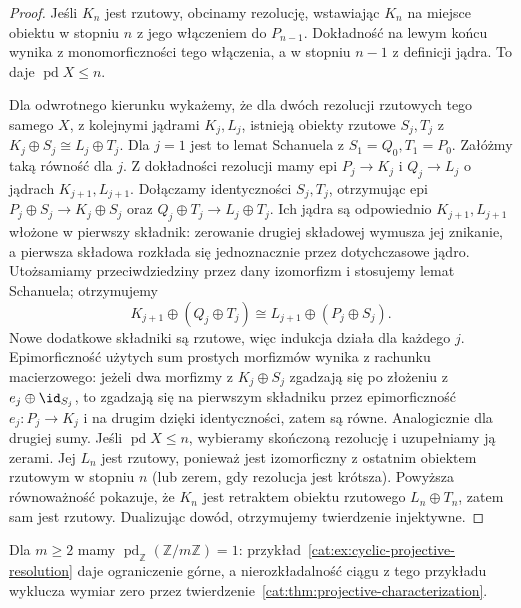 \begin{proof}
Jeśli $K_n$ jest rzutowy, obcinamy rezolucję, wstawiając $K_n$ na miejsce obiektu w stopniu $n$ z jego włączeniem do $P_{n-1}$. Dokładność na lewym końcu wynika z monomorficzności tego włączenia, a w stopniu $n-1$ z definicji jądra. To daje $\operatorname{pd}X\le n$.

Dla odwrotnego kierunku wykażemy, że dla dwóch rezolucji rzutowych tego samego $X$, z kolejnymi jądrami $K_j,L_j$, istnieją obiekty rzutowe $S_j,T_j$ z
$K_j\oplus S_j\cong L_j\oplus T_j$.
Dla $j=1$ jest to lemat Schanuela z $S_1=Q_0,T_1=P_0$. Załóżmy taką równość dla $j$. Z dokładności rezolucji mamy epi $P_j\to K_j$ i $Q_j\to L_j$ o jądrach $K_{j+1},L_{j+1}$. Dołączamy identyczności $S_j,T_j$, otrzymując epi
$P_j\oplus S_j\to K_j\oplus S_j$ oraz
$Q_j\oplus T_j\to L_j\oplus T_j$.
Ich jądra są odpowiednio $K_{j+1},L_{j+1}$ włożone w pierwszy składnik: zerowanie drugiej składowej wymusza jej znikanie, a pierwsza składowa rozkłada się jednoznacznie przez dotychczasowe jądro. Utożsamiamy przeciwdziedziny przez dany izomorfizm i stosujemy lemat Schanuela; otrzymujemy
\[
 K_{j+1}\oplus(Q_j\oplus T_j)\cong L_{j+1}\oplus(P_j\oplus S_j).
\]
Nowe dodatkowe składniki są rzutowe, więc indukcja działa dla każdego $j$. Epimorficzność użytych sum prostych morfizmów wynika z rachunku macierzowego: jeżeli dwa morfizmy z $K_j\oplus S_j$ zgadzają się po złożeniu z $e_j\oplus\id_{S_j}$, to zgadzają się na pierwszym składniku przez epimorficzność $e_j:P_j\to K_j$ i na drugim dzięki identyczności, zatem są równe. Analogicznie dla drugiej sumy.
Jeśli $\operatorname{pd}X\le n$, wybieramy skończoną rezolucję i uzupełniamy ją zerami. Jej $L_n$ jest rzutowy, ponieważ jest izomorficzny z ostatnim obiektem rzutowym w stopniu $n$ (lub zerem, gdy rezolucja jest krótsza). Powyższa równoważność pokazuje, że $K_n$ jest retraktem obiektu rzutowego $L_n\oplus T_n$, zatem sam jest rzutowy. Dualizując dowód, otrzymujemy twierdzenie injektywne.
\end{proof}
\begin{przyklad}
Dla $m\ge2$ mamy $\operatorname{pd}_{\mathbb Z}(\mathbb Z/m\mathbb Z)=1$: przykład~\ref{cat:ex:cyclic-projective-resolution} daje ograniczenie górne, a nierozkładalność ciągu z tego przykładu wyklucza wymiar zero przez twierdzenie~\ref{cat:thm:projective-characterization}.
\end{przyklad}
